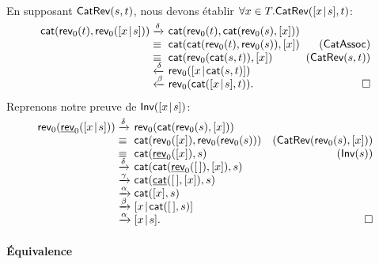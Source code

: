 \noindent En supposant
\(\textsf{CatRev}({s,t})\), nous devons
établir \(\forall x \in T.\textsf{CatRev}({[{x}\!\mid\!{s}],t})\):
 
\begin{equation*}
\begin{array}{@{}r@{\;}l@{\;}l@{\;\;}r@{}}
  \fun{cat}(\fun{rev}_0(t),\fun{rev}_0(\cons{x}{s}))
& \xrightarrow{\smash{\delta}}
& \fun{cat}(\fun{rev}_0(t),\fun{cat}(\fun{rev}_0(s),[x]))\\
& \equiv
& \fun{cat}(\fun{cat}(\fun{rev}_0(t),\fun{rev}_0(s)),[x])
& (\predName{CatAssoc})\\
& \equiv
& \fun{cat}(\fun{rev}_0(\fun{cat}(s,t)),[x])
& (\pred{CatRev}{s,t})\\
& \xleftarrow{\smash{\delta}}
& \fun{rev}_0(\cons{x}{\fun{cat}(s,t)})\\
& \xleftarrow{\smash{\beta}}
& \fun{rev}_0(\fun{cat}(\cons{x}{s},t)).
& \multicolumn{1}{r@{}}{\Box}
\end{array}
\end{equation*}
Reprenons notre preuve de
\(\textsf{Inv}({[{x}\!\mid\!{s}]})\):
\begin{equation*}
\begin{array}{@{}r@{\;}l@{\;}l@{\quad}r@{}}
  \fun{rev}_0(\ufun{rev}_0(\cons{x}{s}))
& \xrightarrow{\smash{\delta}}
& \fun{rev}_0(\fun{cat}(\fun{rev}_0(s),[x]))\\
& \equiv
& \fun{cat}(\fun{rev}_0([x]),\fun{rev}_0(\fun{rev}_0(s)))
& (\pred{CatRev}{\fun{rev}_0(s),[x]})\\
& \equiv
& \fun{cat}(\ufun{rev}_0([x]),s)
& (\pred{Inv}{s})\\
& \xrightarrow{\smash{\delta}}
& \fun{cat}(\fun{cat}(\ufun{rev}_0(\el),[x]),s)\\
& \xrightarrow{\smash{\gamma}}
& \fun{cat}(\ufun{cat}(\el,[x]),s)\\
& \xrightarrow{\smash{\alpha}}
& \fun{cat}([x],s)\\
& \xrightarrow{\smash{\beta}}
& \cons{x}{\fun{cat}(\el,s)}\\
& \xrightarrow{\smash{\alpha}}
& \cons{x}{s}.
& \hfill \Box
\end{array}
\end{equation*}

\paragraph{Équivalence}

